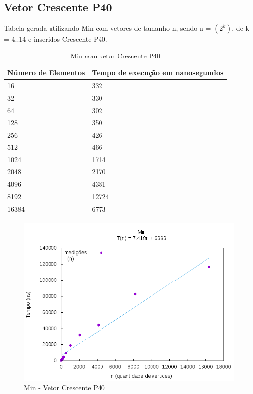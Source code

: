 \documentclass[12pt,a4paper,twoside]{report}
\begin{document}
\subsection{Vetor Crescente P40}
Tabela gerada utilizando Min com vetores de tamanho n, sendo n = $(2^k)$, de k = 4..14 e inseridos Crescente P40.
\begin{table}[H]
\centering
\caption{Min com vetor Crescente P40}
\label{my-label}
\begin{tabular}{|l|l|}
\hline
\multicolumn{1}{|c|}{\textbf{Número de Elementos}} & \multicolumn{1}{c|}{\textbf{Tempo de execução em nanosegundos}} \\ \hline
16 & 332 \\ \hline
32 & 330 \\ \hline
64 & 302 \\ \hline
128 & 350 \\ \hline
256 & 426 \\ \hline
512 & 466 \\ \hline
1024 & 1714 \\ \hline
2048 & 2170 \\ \hline
4096 & 4381 \\ \hline
8192 & 12724 \\ \hline
16384 & 6773 \\ \hline

\end{tabular}
\end{table}

\begin{figure}[H]
    \centering
    \includegraphics[width=0.7\linewidth]{graficos/Min/Crescente P40/Min.png}
  \caption{Min - Vetor Crescente P40}
\end{figure}
\end{document}
